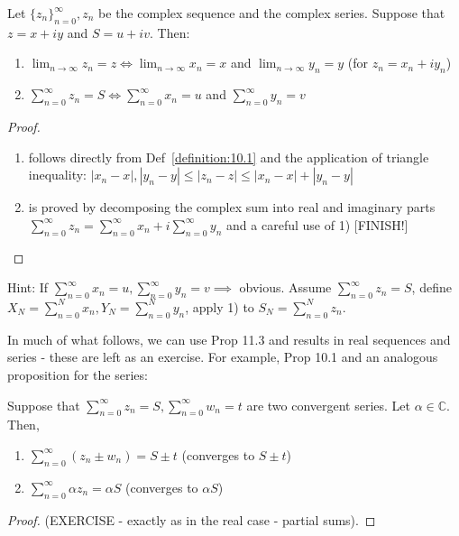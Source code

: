 \begin{proposition}\label{proposition:11.3} Let $\{z_n\}_{n=0}^{\infty}, z_n$ be the complex sequence and the complex series. Suppose that $z = x + iy$ and $S = u + iv$. Then:
\begin{enumerate}
    \item $\lim_{n \to \infty} z_n = z \iff \lim_{n \to \infty} x_n = x$ and $\lim_{n \to \infty} y_n = y$ (for $z_n = x_n + iy_n$)
    \item $\sum_{n=0}^{\infty} z_n = S \iff \sum_{n=0}^{\infty} x_n = u$ and $\sum_{n=0}^{\infty} y_n = v$
\end{enumerate}
\begin{proof}
    \begin{enumerate}
        \item follows directly from Def~\ref{definition:10.1} and the application of triangle inequality: $|x_n - x|, |y_n - y| \leq |z_n - z| \leq |x_n - x| + |y_n - y|$
        \item is proved by decomposing the complex sum into real and imaginary parts $\sum_{n=0}^{\infty} z_n = \sum_{n=0}^{\infty} x_n + i\sum_{n=0}^{\infty} y_n$ and a careful use of 1) [FINISH!]
    \end{enumerate}
\end{proof}
\end{proposition}

Hint: If $\sum_{n=0}^{\infty} x_n = u, \sum_{n=0}^{\infty} y_n = v \implies$ obvious. Assume $\sum_{n=0}^{\infty} z_n = S$, define $X_N = \sum_{n=0}^{N} x_n, Y_N = \sum_{n=0}^{N} y_n$, apply 1) to $S_N = \sum_{n=0}^{N} z_n$.

In much of what follows, we can use Prop 11.3 and results in real sequences and series - these are left as an exercise. For example, Prop 10.1 and an analogous proposition for the series:

\begin{proposition} \label{proposition:11.4} Suppose that $\sum_{n=0}^{\infty} z_n = S, \sum_{n=0}^{\infty} w_n = t$ are two convergent series. Let $\alpha \in \mathbb{C}$. Then,
\begin{enumerate}
    \item $\sum_{n=0}^{\infty} (z_n \pm w_n) = S \pm t$ (converges to $S \pm t$)
    
    \item $\sum_{n=0}^{\infty} \alpha z_n = \alpha S$ (converges to $\alpha S$)
\end{enumerate}

\begin{proof} (EXERCISE - exactly as in the real case - partial sums).
\end{proof}
\end{proposition}

